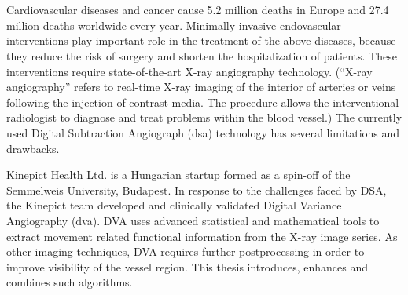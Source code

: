 \chapter{\abstractname}


Cardiovascular diseases and cancer cause 5.2 million deaths in Europe and 27.4 million deaths worldwide every year. Minimally invasive endovascular interventions play important role in the treatment of the above diseases, because they reduce the risk of surgery and shorten the hospitalization of patients. These interventions require state-of-the-art X-ray angiography technology. (“X-ray angiography” refers to real-time X-ray imaging of the interior of arteries or veins following the injection of contrast media. The procedure allows the interventional radiologist to diagnose and treat problems within the blood vessel.) The currently used Digital Subtraction Angiograph (\gls{dsa}) technology has several limitations and drawbacks.

Kinepict Health Ltd. is a Hungarian startup formed as a spin-off of the Semmelweis University, Budapest. In response to the challenges faced by DSA, the Kinepict team developed and clinically validated Digital Variance Angiography (\gls{dva}). DVA uses advanced statistical and mathematical tools to extract movement related functional information from the X-ray image series. As other imaging techniques, DVA requires further postprocessing in order to improve visibility of the vessel region. This thesis introduces, enhances and combines such algorithms.



\makeatletter
{}
{\renewcommand{\abstractname}{Kurzfassung}}
{\renewcommand{\abstractname}{Abstract}}
\makeatother


\begin{otherlanguage}{ngerman} %

\end{otherlanguage}


\makeatletter
{}
{\renewcommand{\abstractname}{Abstract}}
{\renewcommand{\abstractname}{Kurzfassung}}
\makeatother